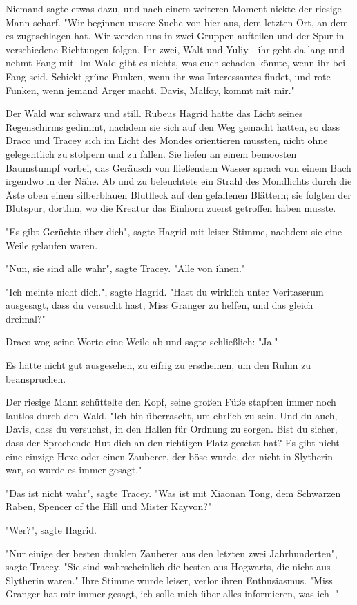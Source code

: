 {Niemand sagte etwas dazu, und nach einem weiteren Moment nickte der riesige Mann scharf. "Wir beginnen unsere Suche von hier aus, dem letzten Ort, an dem es zugeschlagen hat. Wir werden uns in zwei Gruppen aufteilen und der Spur in verschiedene Richtungen folgen. Ihr zwei, Walt und Yuliy - ihr geht da lang und nehmt Fang mit. Im Wald gibt es nichts, was euch schaden könnte, wenn ihr bei Fang seid. Schickt grüne Funken, wenn ihr was Interessantes findet, und rote Funken, wenn jemand Ärger macht. Davis, Malfoy, kommt mit mir."

Der Wald war schwarz und still. Rubeus Hagrid hatte das Licht seines Regenschirms gedimmt, nachdem sie sich auf den Weg gemacht hatten, so dass Draco und Tracey sich im Licht des Mondes orientieren mussten, nicht ohne gelegentlich zu stolpern und zu fallen. Sie liefen an einem bemoosten Baumstumpf vorbei, das Geräusch von fließendem Wasser sprach von einem Bach irgendwo in der Nähe. Ab und zu beleuchtete ein Strahl des Mondlichts durch die Äste oben einen silberblauen Blutfleck auf den gefallenen Blättern; sie folgten der Blutspur, dorthin, wo die Kreatur das Einhorn zuerst getroffen haben musste.

"Es gibt Gerüchte über dich", sagte Hagrid mit leiser Stimme, nachdem sie eine Weile gelaufen waren.

"Nun, sie sind alle wahr", sagte Tracey. "Alle von ihnen."

"Ich meinte nicht dich.", sagte Hagrid. "Hast du wirklich unter Veritaserum ausgesagt, dass du versucht hast, Miss Granger zu helfen, und das gleich dreimal?"

Draco wog seine Worte eine Weile ab und sagte schließlich: "Ja."

Es hätte nicht gut ausgesehen, zu eifrig zu erscheinen, um den Ruhm zu beanspruchen.

Der riesige Mann schüttelte den Kopf, seine großen Füße stapften immer noch lautlos durch den Wald. "Ich bin überrascht, um ehrlich zu sein. Und du auch, Davis, dass du versuchst, in den Hallen für Ordnung zu sorgen. Bist du sicher, dass der Sprechende Hut dich an den richtigen Platz gesetzt hat? Es gibt nicht eine einzige Hexe oder einen Zauberer, der böse wurde, der nicht in Slytherin war, so wurde es immer gesagt."

"Das ist nicht wahr", sagte Tracey. "Was ist mit Xiaonan Tong, dem Schwarzen Raben, Spencer of the Hill und Mister Kayvon?"

"Wer?", sagte Hagrid.

"Nur einige der besten dunklen Zauberer aus den letzten zwei Jahrhunderten", sagte Tracey. "Sie sind wahrscheinlich die besten aus Hogwarts, die nicht aus Slytherin waren." Ihre Stimme wurde leiser, verlor ihren Enthusiasmus. "Miss Granger hat mir immer gesagt, ich solle mich über alles informieren, was ich -"

}
